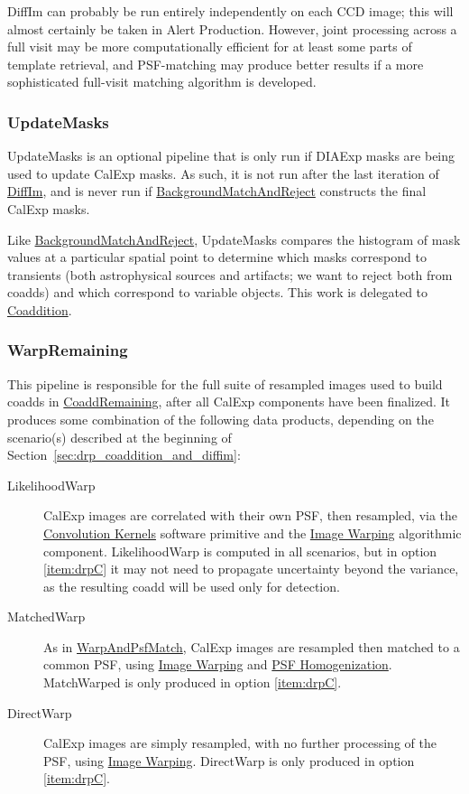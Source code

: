 DiffIm can probably be run entirely independently on each CCD image; this will almost certainly be taken in Alert Production.  However, joint processing across a full visit may be more computationally efficient for at least some parts of template retrieval, and PSF-matching may produce better results if a more sophisticated full-visit matching algorithm is developed.

\subsubsection{UpdateMasks}
\label{sec:drpUpdateMasks}

UpdateMasks is an optional pipeline that is only run if DIAExp masks are being used to update CalExp masks.  As such, it is not run after the last iteration of \hyperref[sec:drpDiffIm]{DiffIm}, and is never run if \hyperref[sec:drpBackgroundMatchAndReject]{BackgroundMatchAndReject} constructs the final CalExp masks.

Like \hyperref[sec:drpBackgroundMatchAndReject]{BackgroundMatchAndReject}, UpdateMasks compares the histogram of mask values at a particular spatial point to determine which masks correspond to transients (both astrophysical sources and artifacts; we want to reject both from coadds) and which correspond to variable objects.  This work is delegated to \hyperref[sec:acCoaddition]{Coaddition}.

\subsubsection{WarpRemaining}
\label{sec:drpWarpRemaining}

This pipeline is responsible for the full suite of resampled images used to build coadds in \hyperref[sec:drpCoaddRemaining]{CoaddRemaining}, after all CalExp components have been finalized.  It produces some combination of the following data products, depending on the scenario(s) described at the beginning of Section~\ref{sec:drp_coaddition_and_diffim}:
\begin{description}
\item[LikelihoodWarp] CalExp images are correlated with their own PSF, then resampled, via the \hyperref[sec:spKernels]{Convolution Kernels} software primitive and the \hyperref[sec:acWarping]{Image Warping} algorithmic component.  LikelihoodWarp is computed in all scenarios, but in option \ref{item:drpC} it may not need to propagate uncertainty beyond the variance, as the resulting coadd will be used only for detection.
\item[MatchedWarp] As in \hyperref[sec:drpWarpAndPsfMatch]{WarpAndPsfMatch}, CalExp images are resampled then matched to a common PSF, using \hyperref[sec:acWarping]{Image Warping} and \hyperref[sec:acPSFHomogenization]{PSF Homogenization}.  MatchWarped is only produced in option \ref{item:drpC}.
\item[DirectWarp] CalExp images are simply resampled, with no further processing of the PSF, using \hyperref[sec:acWarping]{Image Warping}.  DirectWarp is only produced in option \ref{item:drpC}.
\end{description}

